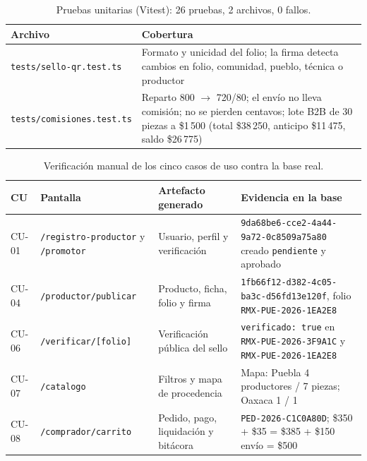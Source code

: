 \documentclass[conference,letterpaper,onecolumn]{IEEEtran}
\begin{document}
\begin{table}[H]
\caption{Pruebas unitarias (Vitest): 26 pruebas, 2 archivos, 0 fallos.}
\label{tab:tests}
\centering
\renewcommand{\arraystretch}{1.05}
\begin{tabular}{@{}L{0.38\columnwidth}L{0.54\columnwidth}@{}}
\toprule
\textbf{Archivo} & \textbf{Cobertura} \\
\midrule
\nolinkurl{tests/sello-qr.test.ts} & Formato y unicidad del folio; la firma detecta cambios en folio, comunidad, pueblo, técnica o productor \\
\nolinkurl{tests/comisiones.test.ts} & Reparto 800 $\rightarrow$ 720/80; el envío no lleva comisión; no se pierden centavos; lote B2B de 30 piezas a \$1\,500 (total \$38\,250, anticipo \$11\,475, saldo \$26\,775) \\
\bottomrule
\end{tabular}
\end{table}

\begin{table}[H]
\caption{Verificación manual de los cinco casos de uso contra la base real.}
\label{tab:evidencia}
\centering
\renewcommand{\arraystretch}{1.08}
\begin{tabular}{@{}L{0.07\textwidth}L{0.26\textwidth}L{0.31\textwidth}L{0.28\textwidth}@{}}
\toprule
\textbf{CU} & \textbf{Pantalla} & \textbf{Artefacto generado} & \textbf{Evidencia en la base} \\
\midrule
CU-01 & \texttt{/registro-productor} y \texttt{/promotor} & Usuario, perfil y verificación & \nolinkurl{9da68be6-cce2-4a44-9a72-0c8509a75a80} creado \texttt{pendiente} y aprobado \\
CU-04 & \texttt{/productor/publicar} & Producto, ficha, folio y firma & \nolinkurl{1fb66f12-d382-4c05-ba3c-d56fd13e120f}, folio \nolinkurl{RMX-PUE-2026-1EA2E8} \\
CU-06 & \texttt{/verificar/[folio]} & Verificación pública del sello & \texttt{verificado: true} en \nolinkurl{RMX-PUE-2026-3F9A1C} y \nolinkurl{RMX-PUE-2026-1EA2E8} \\
CU-07 & \texttt{/catalogo} & Filtros y mapa de procedencia & Mapa: Puebla 4 productores / 7 piezas; Oaxaca 1 / 1 \\
CU-08 & \texttt{/comprador/carrito} & Pedido, pago, liquidación y bitácora & \texttt{PED-2026-C1C0A80D}; \$350 + \$35 = \$385 + \$150 envío = \$500 \\
\bottomrule
\end{tabular}
\end{table}
\end{document}
